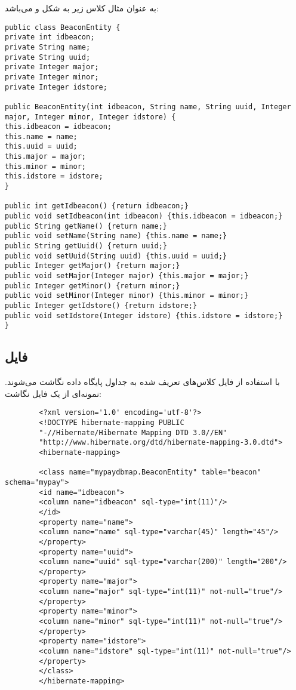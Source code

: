 \documentclass[oneside]{report}
\begin{document}
			
			\noindent
			به عنوان مثال کلاس 
									{\normalsize {}}
									زیر به شکل 
															{\normalsize {}}
															و 
																					{\normalsize {}} 
																					می‌باشد:
		\begin{latin}
		\begin{verbatim}
public class BeaconEntity {
private int idbeacon;
private String name;
private String uuid;
private Integer major;
private Integer minor;
private Integer idstore;

public BeaconEntity(int idbeacon, String name, String uuid, Integer major, Integer minor, Integer idstore) {
this.idbeacon = idbeacon;
this.name = name;
this.uuid = uuid;
this.major = major;
this.minor = minor;
this.idstore = idstore;
}

public int getIdbeacon() {return idbeacon;}
public void setIdbeacon(int idbeacon) {this.idbeacon = idbeacon;}
public String getName() {return name;}
public void setName(String name) {this.name = name;}
public String getUuid() {return uuid;}
public void setUuid(String uuid) {this.uuid = uuid;}
public Integer getMajor() {return major;}
public void setMajor(Integer major) {this.major = major;}
public Integer getMinor() {return minor;}
public void setMinor(Integer minor) {this.minor = minor;}
public Integer getIdstore() {return idstore;}
public void setIdstore(Integer idstore) {this.idstore = idstore;}
}

		\end{verbatim}
		
	\end{latin}	
	
		\subsection{ فایل{\normalsize {}} }	
		با استفاده از فایل 
									{\normalsize {}}
	کلاس‌های تعریف شده به جداول پایگاه داده نگاشت می‌شوند. 
	نمونه‌ای از یک فایل نگاشت:
		\begin{latin}
		\begin{verbatim}
		<?xml version='1.0' encoding='utf-8'?>
		<!DOCTYPE hibernate-mapping PUBLIC
		"-//Hibernate/Hibernate Mapping DTD 3.0//EN"
		"http://www.hibernate.org/dtd/hibernate-mapping-3.0.dtd">
		<hibernate-mapping>
		
		<class name="mypaydbmap.BeaconEntity" table="beacon" schema="mypay">
		<id name="idbeacon">
		<column name="idbeacon" sql-type="int(11)"/>
		</id>
		<property name="name">
		<column name="name" sql-type="varchar(45)" length="45"/>
		</property>
		<property name="uuid">
		<column name="uuid" sql-type="varchar(200)" length="200"/>
		</property>
		<property name="major">
		<column name="major" sql-type="int(11)" not-null="true"/>
		</property>
		<property name="minor">
		<column name="minor" sql-type="int(11)" not-null="true"/>
		</property>
		<property name="idstore">
		<column name="idstore" sql-type="int(11)" not-null="true"/>
		</property>
		</class>
		</hibernate-mapping>
		\end{verbatim}
		
	\end{latin}											
		
\end{document}
